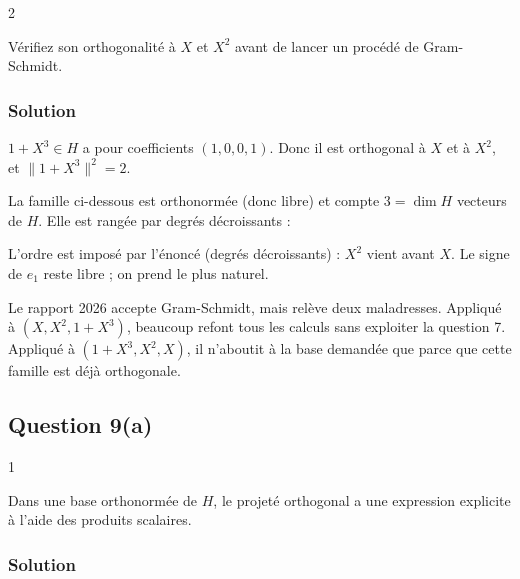 \documentclass[11pt,a4paper]{article}
\newcommand{\equationajustee}[1]{%
  \sbox{\boiteequation}{$\displaystyle #1$}%
  \ifdim\wd\boiteequation>\linewidth
    \[\resizebox{\linewidth}{!}{\usebox{\boiteequation}}\]%
  \else
    \[#1\]%
  \fi}
\begin{document}
\begin{indication}{2}

Vérifiez son orthogonalité à \(X\) et \(X^2\) avant de lancer un procédé de Gram-Schmidt.

\end{indication}

\hypertarget{solution-7}{%
\subsubsection{Solution}\label{solution-7}}

\(1+X^3\in H\) a pour coefficients \((1,0,0,1)\). Donc il est orthogonal à \(X\) et à \(X^2\), et \(\|1+X^3\|^2=2\).

La famille ci-dessous est orthonormée (donc libre) et compte \(3=\dim H\) vecteurs de \(H\). Elle est rangée par degrés décroissants :

\equationajustee{\boxed{\mathcal{B}=(e_1,e_2,e_3)=\Big(\frac{1+X^3}{\sqrt2},\ X^2,\ X\Big).}}

\begin{piege}

L'ordre est imposé par l'énoncé (degrés décroissants) : \(X^2\) vient avant \(X\). Le signe de \(e_1\) reste libre ; on prend le plus naturel.

\end{piege}

\begin{jury}

Le rapport 2026 accepte Gram-Schmidt, mais relève deux maladresses. Appliqué à \((X,X^2,1+X^3)\), beaucoup refont tous les calculs sans exploiter la question 7. Appliqué à \((1+X^3,X^2,X)\), il n'aboutit à la base demandée que parce que cette famille est déjà orthogonale.

\end{jury}

\hypertarget{question-9a}{%
\subsection{Question 9(a)}\label{question-9a}}

\begin{indication}{1}

Dans une base orthonormée de \(H\), le projeté orthogonal a une expression explicite à l'aide des produits scalaires.

\end{indication}

\hypertarget{solution-8}{%
\subsubsection{Solution}\label{solution-8}}
\end{document}
